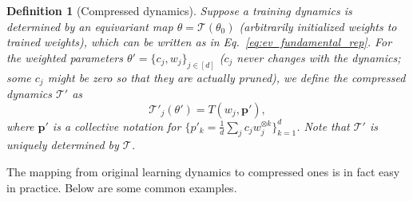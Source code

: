 \documentclass{article}
\theoremstyle{plain}
\newtheorem{definition}{Definition}
\begin{document}
\begin{definition}[Compressed dynamics]
    Suppose a training dynamics is determined by an equivariant map $\theta = \mathcal{T}(\theta_0)$ (arbitrarily initialized weights to trained weights), which can be written as in Eq.~\eqref{eq:ev_fundamental_rep}. For the weighted parameters $\theta' = \{c_j, w_j\}_{j\in [d]}$ ($c_j$ never changes with the dynamics; some $c_j$ might be zero so that they are actually pruned), we define the compressed dynamics $\mathcal{T}'$ as
    \begin{equation}    \label{eq:compressed_dynamics}
        \mathcal{T}'_j (\theta') = T(w_j, \bm{p}') ,
    \end{equation}
    where $\bm{p}'$ is a collective notation for $\{p'_k = \frac{1}{d}\sum_j c_j w_j^{\otimes k}\}_{k=1}^{d}$. Note that $\mathcal{T}'$ is uniquely determined by $\mathcal{T}$. 
\end{definition}

The mapping from original learning dynamics to compressed ones is in fact easy in practice. Below are some common examples.
\end{document}
